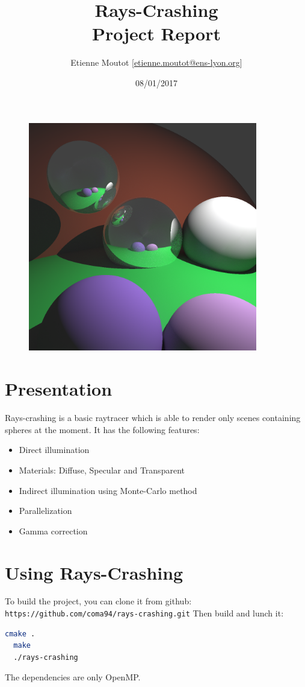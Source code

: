 \documentclass[11pt]{article}
\title{\vspace{-8ex}
\huge Rays-Crashing\\
{\normalsize Project Report}}
\author{Etienne Moutot [\href{mailto:etienne.moutot@ens-lyon.org}{etienne.moutot@ens-lyon.org}]}
\date{08/01/2017}
\begin{document}
\maketitle

\begin{figure}[h]
\centering
\includegraphics[width=10cm]{img/ex_1000.png}
\end{figure}

\section{Presentation}
Rays-crashing is a basic raytracer which is able to render only scenes containing spheres at the moment. It has the following features:
\begin{itemize}
  \item Direct illumination
  \item Materials: Diffuse, Specular and Transparent
  \item Indirect illumination using Monte-Carlo method
  \item Parallelization
  \item Gamma correction
\end{itemize}

\section{Using Rays-Crashing}
To build the project, you can clone it from github: \texttt{https://github.com/coma94/rays-crashing.git}
Then build and lunch it:
\begin{lstlisting}[language=bash]
  cmake .
  make
  ./rays-crashing
\end{lstlisting}
The dependencies are only OpenMP.
\end{document}

